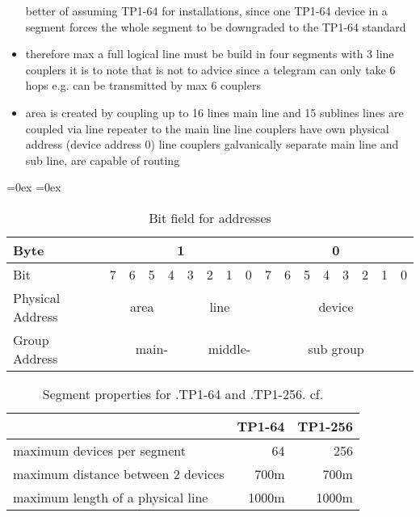 \begin{itemize}
			\subitem better of assuming TP1-64 for installations, since one TP1-64 device in a segment forces the whole segment to be downgraded to the TP1-64 standard
		\item therefore max a full logical line must be build in four segments with 3 line couplers \parencite{Sokollik2017}
			\subitem it is to note that is not to advice since a \knx telegram can only take 6 hops
			\subitem e.g. can be transmitted by max 6 couplers
		\item area is created by coupling up to 16 lines \parencite{Sokollik2017}
			 main line and 15 sublines
			\subitem lines are coupled via line repeater to the main line
			\subitem line couplers have own physical address (device address 0) \parencite{Sokollik2017}
			\subitem line couplers galvanically separate main line and sub line, are capable of routing \parencite{Sokollik2017}
			
	\end{itemize}
	
	\begin{table}
		\aboverulesep=0ex
		\belowrulesep=0ex
		\renewcommand{\arraystretch}{1.2}
		
		\centering
		\begin{tabular}{|l|c|c|c|c|c|c|c|c|c|c|c|c|c|c|c|c|}
			\toprule
			Byte & \multicolumn{8}{c|}{1} & \multicolumn{8}{c|}{0} \\\midrule
			Bit & 7 & 6 & 5 & 4 & 3 & 2 & 1 & 0 & 7 & 6 & 5 & 4 & 3 & 2 & 1 & 0\\\midrule
			Physical Address & \multicolumn{4}{c|}{area} & \multicolumn{4}{c|}{line} & \multicolumn{8}{c|}{device}\\\midrule
			Group Address & \multicolumn{5}{c|}{main-} & \multicolumn{3}{c|}{middle-} & \multicolumn{8}{c|}{sub group}\\
			\bottomrule
		\end{tabular}
		\caption{Bit field for \knx addresses}
		\label{tab:background:bas:knx:topo:addr}
	\end{table}
	
	\begin{table}
		\centering
		\begin{tabular}{l r r }
			 & \textbf{TP1-64} & \textbf{TP1-256} \\\toprule
			 maximum devices per segment & 64 & 256 \\
			 maximum distance between 2 devices & 700m & 700m \\
			 maximum length of a physical line & 1000m & 1000m \\
			 \bottomrule
		\end{tabular}
		\caption[Segment properties for \knx.TP1-64 and \knx.TP1-256]{Segment properties for \knx.TP1-64 and \knx.TP1-256. cf. \textcite{Sokollik2017}}
		\label{tab:background:bas:knx:topo:tpsegments}
	\end{table}
	
